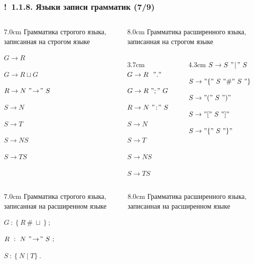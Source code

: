 \documentclass[mathserif,12pt,aspectratio=169]{beamer}
\def\Ok{{\color{green}\textbf{!}\ }}
\begin{document}
\begin{frame}
\frametitle{\Ok 1.1.8. Языки записи грамматик (7/9)}
\begin{columns}[t]
\begin{column}{7.0cm}
Грамматика строгого языка, записанная на строгом языке

$G \rightarrow R$

$G \rightarrow R\sqcup G$

$R \rightarrow N\ "\!\rightarrow\!"\ S$

$S \rightarrow N $

$S \rightarrow T $

$S \rightarrow N S$

$S \rightarrow T S$

\end{column} 
\begin{column}{8.0cm}
Грамматика расширенного языка, записанная на строгом языке

\begin{columns}[t]
\begin{column}{3.7cm}
$G \rightarrow R\ \ "."$

$G \rightarrow R\ ";"\ G$

$R  \rightarrow N\ "\!:\!"\ S$

$S \rightarrow N $

$S \rightarrow T $

$S \rightarrow N S$

$S \rightarrow T S$
\end{column}
\begin{column}{4.3cm}
$S \rightarrow S\  "\!\mid\!"\  S $

$S \rightarrow "\{"\ S\  "\#"\  S\  "\}"$

$S \rightarrow "("\ S\ ")" $

$S \rightarrow "["\ S\ "]" $

$S \rightarrow "\{"\ S\ "\}" $
\end{column}
\end{columns}
\end{column} 
\end{columns}

\medskip
\begin{columns}[t]
\begin{column}{7.0cm}
Грамматика строгого языка, записанная на расширенном языке

$G\ :\ \{\ R\ \#\ \sqcup\ \}\ ; $

$R\ :\ N\ "\!\rightarrow\!"\ S\ ;$

$S\ :\ \{\ N \mid T \}\ . $
\end{column} 
\begin{column}{8.0cm}
Грамматика расширенного языка, записанная на расширенном языке


\end{column}
\end{columns}
\end{frame}
\end{document}
